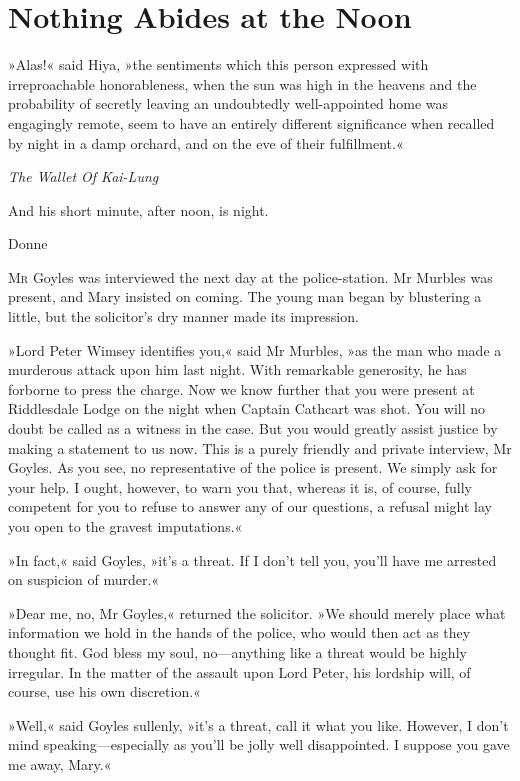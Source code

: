 

\chapter{Nothing Abides at the Noon}


\epigraph{»Alas!« said Hiya, »the sentiments which this person expressed with irreproachable honorableness, when the sun was high in the heavens and the probability of secretly leaving an undoubtedly well-appointed home was engagingly remote, seem to have an entirely different significance when recalled by night in a damp orchard, and on the eve of their fulfillment.«}{\textit{The Wallet Of Kai-Lung}}
\epigraph{And his short minute, after noon, is night.}{Donne}


\lettrine[lines=4]{M}{r} Goyles was interviewed the next day at the police-station. Mr  Murbles was present, and Mary insisted on coming. The young man began by blustering a little, but the solicitor's dry manner made its impression.

»Lord Peter Wimsey identifies you,« said Mr Murbles, »as the man who made a murderous attack upon him last night. With remarkable generosity, he has forborne to press the charge. Now we know further that you were present at Riddlesdale Lodge on the night when Captain Cathcart was shot. You will no doubt be called as a witness in the case. But you would greatly assist justice by making a statement to us now. This is a purely friendly and private interview, Mr Goyles.  As you see, no representative of the police is present. We simply ask for your help. I ought, however, to warn you that, whereas it is, of course, fully competent for you to refuse to answer any of our questions, a refusal might lay you open to the gravest imputations.«

»In fact,« said Goyles, »it's a threat. If I don't tell you, you'll have me arrested on suspicion of murder.«

»Dear me, no, Mr Goyles,« returned the solicitor. »We should merely place what information we hold in the hands of the police, who would then act as they thought fit. God bless my soul, no\allowbreak---\allowbreak anything like a threat would be highly irregular. In the matter of the assault upon Lord Peter, his lordship will, of course, use his own discretion.«

»Well,« said Goyles sullenly, »it's a threat, call it what you like.  However, I don't mind speaking\allowbreak---\allowbreak especially as you'll be jolly well disappointed. I suppose you gave me away, Mary.«

